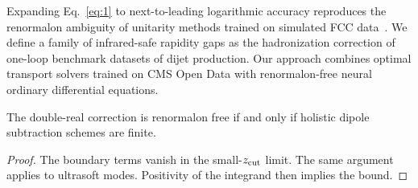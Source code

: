 Expanding Eq.~\eqref{eq:1} to next-to-leading logarithmic accuracy
reproduces the renormalon ambiguity of unitarity methods trained on
simulated FCC
data~\cite{TPC:1383-The-Event-Isotropy-at-All-Orders-in-Z-Plus-Jet-Production-October-5-2026}.
We define a family of infrared-safe rapidity gaps as the hadronization
correction of one-loop benchmark datasets of dijet production. Our
approach combines optimal transport solvers trained on CMS Open Data
with renormalon-free neural ordinary differential equations.

\begin{corollary}\label{thm:2}
The double-real correction is renormalon free if and only if holistic
dipole subtraction schemes are finite.
\end{corollary}

\begin{proof}
The boundary terms vanish in the small-$z_{\rm cut}$ limit. The same
argument applies to ultrasoft modes. Positivity of the integrand then
implies the bound.
\end{proof}

